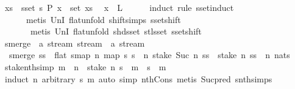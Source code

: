 \begin{isabellebody}
\ {\isachardoublequoteopen}xs\ {\isasymin}\ sset\ s{\isachardoublequoteclose}\ {\isacharquery}P\ {\isachardoublequoteopen}x\ {\isasymin}\ set\ xs{\isachardoublequoteclose}\ \isamarkupfalse%
\ {\isachardoublequoteopen}x\ {\isasymin}\ {\isacharquery}L{\isachardoublequoteclose}\isanewline
\ \ \ \ \isamarkupfalse%
\ {\isacharparenleft}induct\ rule{\isacharcolon}\ sset{\isacharunderscore}induct{\isacharparenright}\isanewline
\ \ \ \ \ \ {\isacharparenleft}metis\ UnI{}\ flat{\isacharunderscore}unfold\ shift{\isachardot}simps{\isacharparenleft}{}{\isacharparenright}\ sset{\isacharunderscore}shift{\isacharcomma}\isanewline
\ \ \ \ \ \ \ metis\ UnI{}\ flat{\isacharunderscore}unfold\ shd{\isacharunderscore}sset\ stl{\isacharunderscore}sset\ sset{\isacharunderscore}shift{\isacharparenright}\isanewline
{}\isamarkupfalse%
%
\endisatagproof
{\isafoldproof}%
%
\isadelimproof
%
\endisadelimproof
%
\isadelimdocument
%
\endisadelimdocument
%
\isatagdocument
%
\isamarkuptrue%
%
\endisatagdocument
{\isafolddocument}%
%
\isadelimdocument
%
\endisadelimdocument
{}\isamarkupfalse%
\ smerge\ {\isacharcolon}{\isacharcolon}\ {\isachardoublequoteopen}{\isacharprime}a\ stream\ stream\ {\isasymRightarrow}\ {\isacharprime}a\ stream{\isachardoublequoteclose}\ \isanewline
\ \ {\isachardoublequoteopen}smerge\ ss\ {\isacharequal}\ flat\ {\isacharparenleft}smap\ {\isacharparenleft}{\isasymlambda}n{\isachardot}\ map\ {\isacharparenleft}{\isasymlambda}s{\isachardot}\ s\ {\isacharbang}{\isacharbang}\ n{\isacharparenright}\ {\isacharparenleft}stake\ {\isacharparenleft}Suc\ n{\isacharparenright}\ ss{\isacharparenright}\ {\isacharat}\ stake\ n\ {\isacharparenleft}ss\ {\isacharbang}{\isacharbang}\ n{\isacharparenright}{\isacharparenright}\ nats{\isacharparenright}{\isachardoublequoteclose}\isanewline
\isanewline
{}\isamarkupfalse%
\ stake{\isacharunderscore}nth{\isacharbrackleft}simp{\isacharbrackright}{\isacharcolon}\ {\isachardoublequoteopen}m\ {\isacharless}\ n\ {\isasymLongrightarrow}\ stake\ n\ s\ {\isacharbang}\ m\ {\isacharequal}\ s\ {\isacharbang}{\isacharbang}\ m{\isachardoublequoteclose}\isanewline
%
\isadelimproof
\ \ %
\endisadelimproof
%
\isatagproof
{}\isamarkupfalse%
\ {\isacharparenleft}induct\ n\ arbitrary{\isacharcolon}\ s\ m{\isacharparenright}\ {\isacharparenleft}auto\ simp{\isacharcolon}\ nth{\isacharunderscore}Cons{\isacharprime}{\isacharcomma}\ metis\ Suc{\isacharunderscore}pred\ snth{\isachardot}simps{\isacharparenleft}{}{\isacharparenright}{\isacharparenright}%

\end{isabellebody}
